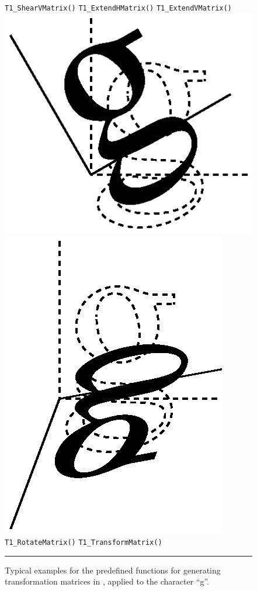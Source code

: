 \begin{figure}[t]
\hfill\break
\noindent\vrule width 0pt\hfill\verb+T1_ShearVMatrix()+\hfill
\verb+T1_ExtendHMatrix()+\hfill
\verb+T1_ExtendVMatrix()+\hfill\break
\vskip0.5cm
\hfill
\includegraphics[scale=0.5]{rotate.eps}
\hfill
\includegraphics[scale=0.5]{arbitrary.eps}
\hfill\break
\noindent\vrule width 0pt\hfill\verb+T1_RotateMatrix()+\hfill
\verb+T1_TransformMatrix()+\hfill\break
\vskip3mm
\hrule\vskip3mm\small
\caption{\label{figure:transformations}Typical examples for the predefined
  functions for generating transformation matrices in \tonelib, applied to the
  character ``g''.} 
\end{figure}

